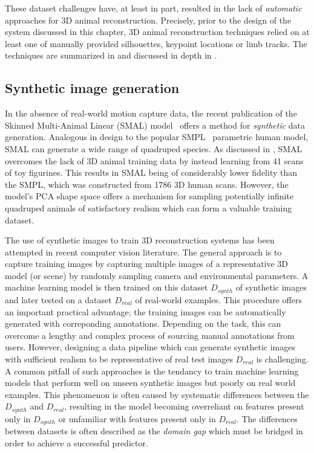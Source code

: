 These dataset challenges have, at least in part, resulted in the lack of \emph{automatic} approaches for 3D animal reconstruction. Precisely, prior to the design of the system discussed in this chapter, 3D animal reconstruction techniques relied on at least one of manually provided silhouettes, keypoint locations or limb tracks. The techniques are summarized in  and discussed in depth in . 




\subsection{Synthetic image generation}

In the absence of real-world motion capture data, the recent publication of the Skinned Multi-Animal Linear (SMAL) model~\cite{zuffi2017menagerie} offers a method for \emph{synthetic} data generation. Analogous in design to the popular SMPL~\cite{loper15smpl} parametric human model, SMAL can generate a wide range of quadruped species. As discussed in , SMAL overcomes the lack of 3D animal training data by instead learning from 41 scans of toy figurines. This results in SMAL being of considerably lower fidelity than the SMPL, which was constructed from 1786 3D human scans. However, the model's PCA shape space offers a mechanism for sampling potentially infinite quadruped animals of satisfactory realism which can form a valuable training dataset.

The use of synthetic images to train 3D reconstruction systems has been attempted in recent computer vision literature. The general approach is to capture training images by capturing multiple images of a representative 3D model (or scene) by randomly sampling camera and environmental parameters. A machine learning model is then trained on this dataset $D_{synth}$ of synthetic images and later tested on a dataset $D_{real}$ of real-world examples. This procedure offers an important practical advantage; the training images can be automatically generated with correponding annotations. Depending on the task, this can overcome a lengthy and complex process of sourcing manual annotations from users. However, designing a data pipeline which can generate synthetic images with sufficient realism to be representative of real test images $D_{real}$ is challenging. A common pitfall of such approaches is the tendancy to train machine learning models that perform well on unseen synthetic images but poorly on real world examples. This phenomenon is often caused by systematic differences between the $D_{synth}$ and $D_{real}$, resulting in the model becoming overreliant on features present only in $D_{synth}$ or unfamiliar with features present only in $D_{real}$. The differences between datasets is often described as the \emph{domain gap} which must be bridged in order to achieve a successful predictor. 

